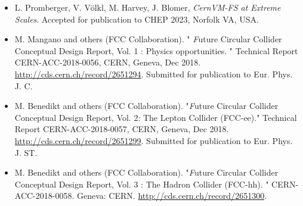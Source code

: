 \begin{itemize}

\item[] L. Promberger, V. V\"olkl, M. Harvey, J. Blomer, \emph {CernVM-FS at Extreme Scales}. Accepted for publication to CHEP 2023, Norfolk VA, USA.

\item[] {M. Mangano and others (FCC Collaboration). "{ \emph Future Circular Collider Conceptual
Design Report, Vol. 1 : Physics opportunities. }" Technical Report CERN-ACC-2018-0056, CERN, Geneva,
Dec 2018.  \url{http://cds.cern.ch/record/2651294}.  Submitted for publication to Eur. Phys. J. C.} \\

\item[] {M.  Benedikt  and  others  (FCC  Collaboration). "{\emph Future  Circular  Collider
Conceptual  Design  Report,  Vol.  2:  The  Lepton  Collider  (FCC-ee).}"   Technical Report
CERN-ACC-2018-0057, CERN, Geneva, Dec  2018.   \url{http://cds.cern.ch/record/2651299}.  Submitted for publication to Eur. Phys. J. ST.} \\

\item { M.  Benedikt  and  others  (FCC  Collaboration). "{\emph Future Circular Collider Conceptual Design Report, Vol. 3 : The Hadron Collider
(FCC-hh). }" CERN-ACC-2018-0058. Geneva: CERN. \url{http://cds.cern.ch/record/2651300}.} \\



\end{itemize}

